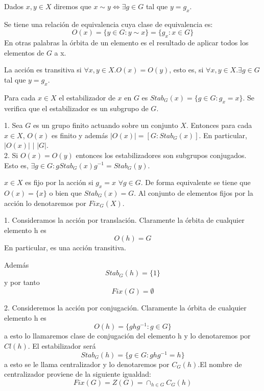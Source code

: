 \begin{definition}
Dados $x,y \in X$ diremos que $x \sim y \iff \exists g \in G$ tal que $y = g_x$. 

Se tiene una relación de equivalencia cuya clase de equivalencia es: $$O(x) = \{y \in G:y \sim x\} = \{g_x:x \in G\}$$ En otras palabras la órbita de un elemento es el resultado de aplicar todos los elementos de $G$ a x. 

La acción es transitiva si $\forall x,y \in X.O(x) = O(y)$, esto es, si $\forall x,y \in X. \exists g \in G$ tal que $y = g_x$.
\end{definition}

\begin{definition}[Estabilizador]
Para cada $x \in X$ el estabilizador de $x$ en $G$ es $Stab_G(x) = \{g \in G:g_x = x\}$. Se verifica que el estabilizador es un subgrupo de $G$.
\end{definition}

\begin{proposition}
1. Sea $G$ es un grupo finito actuando sobre un conjunto $X$. Entonces para cada $x \in X$, $O(x)$ es finito y además $|O(x)| = [G:Stab_G(x)]$. En particular, $|O(x)|$ $|$ $|G|$.\\
2. Si $O(x) = O(y)$ entonces los estabilizadores son subgrupos conjugados. Esto es, $\exists g \in G:g Stab_G(x) g^{-1} = Stab_G(y)$.
\end{proposition}

\begin{definition}
$x \in X$ es fijo por la acción si $g_x = x$ $\forall g \in G$. De forma equivalente se tiene que $O(x) = \{x\}$ o bien que $Stab_G(x) = G$. Al conjunto de elementos fijos por la acción lo denotaremos por $Fix_G(X)$.
\end{definition}

\begin{example}
1. Consideramos la acción por translación. Claramente la órbita de cualquier elemento h es $$O(h) = G$$ En particular, es una acción transitiva. 

Además $$Stab_G(h) = \{1\}$$ y por tanto $$Fix(G) = \emptyset$$

2. Consideremos la acción por conjugación. Claramente la órbita de cualquier elemento h es $$O(h) = \{ghg^{-1}:g \in G\}$$ a esto lo llamaremos clase de conjugación del elemento h y lo denotaremos por $Cl(h)$. El estabilizador será $$Stab_G(h) = \{g \in G:ghg^{-1}  = h\}$$ a esto se le llama centralizador y lo denotaremos por $C_G(h)$.El nombre de centralizador proviene de la siguiente igualdad: $$Fix(G) = Z(G) = \cap_{h \in G} C_G(h)$$ 
 \end{example}